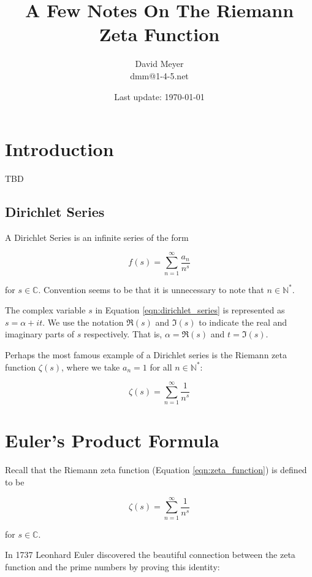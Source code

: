 \documentclass[11pt, oneside]{article}   	%
\title{A Few Notes On The Riemann Zeta Function}
\author{David Meyer \\ dmm@1-4-5.net}
\date{Last update: \today}							%
\theoremstyle{definition}
\begin{document}
\maketitle

\section{Introduction}
TBD

\subsection{Dirichlet Series}
A Dirichlet Series \cite{mccarthy2018} is an infinite series of the form

\bigskip
\begin{equation}
f(s) = \sum\limits_{n = 1}^{\infty} \frac{a_n}{n^s}
\label{eqn:dirichlet_series}
\end{equation}

\bigskip
\noindent
for $s \in \mathbb{C}$. Convention seems to be that it is unnecessary to note that $n \in \mathbb{N}^*$.  

\bigskip
\noindent
The complex variable $s$ in Equation \ref{eqn:dirichlet_series} is represented as $s = \alpha + i t$. We use the 
notation $ \Re(s)$ and $\Im(s)$ to indicate the real and imaginary parts of $s$ respectively. That is, 
$\alpha = \Re(s)$ and $t = \Im(s)$.


\bigskip
\noindent
Perhaps the most famous example of a Dirichlet series is the Riemann zeta function $\zeta(s)$, where
we take $a_n = 1$ for all $n \in \mathbb{N}^*$:


\bigskip
\begin{equation}
\zeta(s) = \sum^\infty_{n = 1} \frac{1}{n^s}
\label{eqn:zeta_function}
\end{equation}

\bigskip
\section{Euler's Product Formula}
Recall that the Riemann zeta function (Equation \ref{eqn:zeta_function}) is defined to be

\medskip
\begin{equation*}
\zeta(s) = \sum^\infty_{n = 1} \frac{1}{n^s}
\end{equation*}

\noindent
for $s \in \mathbb{C}$.

\bigskip
\noindent
In 1737 Leonhard Euler \cite{euler_product_formula} discovered the beautiful connection between the zeta function and the prime numbers by proving this identity:
\end{document}
